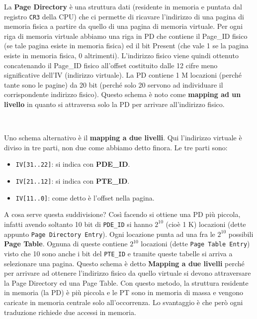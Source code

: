 \documentclass[11pt]{book}
\begin{document}
La \textbf{Page Directory} \`e una struttura dati (residente in
memoria e puntata dal registro \texttt{CR3} della CPU) che ci permette
di ricavare l'indirizzo di una pagina di memoria fisica a partire da
quello di una pagina di memoria virtuale. Per ogni riga di memoria
virtuale abbiamo una riga in PD che contiene il Page\_ID fisico (se
tale pagina esiste in memoria fisica) ed il bit Present (che vale 1 se
la pagina esiste in memoria fisica, 0 altrimenti). L'indirizzo fisico
viene quindi ottenuto concatenando il Page\_ID fisico all'offset
costituito dalle 12 cifre meno significative dell'IV (indirizzo
virtuale). La PD contiene 1 M locazioni (perch\'e tante sono le
pagine) da 20 bit (perch\'e solo 20 servono ad individuare il
corrispondente indirizzo fisico). Questo schema \`e noto come
\textbf{mapping ad un livello} in quanto si attraversa solo la PD per
arrivare all'indirizzo fisico.

\

Uno schema alternativo \`e il \textbf{mapping a due livelli}. Qui
l'indirizzo virtuale \`e diviso in tre parti, non due come abbiamo
detto finora. Le tre parti sono:

\begin{itemize}
\item \texttt{IV[31..22]}: si indica con \textbf{PDE\_ID}.
\item \texttt{IV[21..12]}: si indica con \textbf{PTE\_ID}.
\item \texttt{IV[11..0]}: come detto \`e l'offset nella pagina.
\end{itemize}

A cosa serve questa suddivisione? Cos\`i facendo si ottiene una PD
pi\`u piccola, infatti avendo soltanto 10 bit di \texttt{PDE\_ID} si
hanno $2^{10}$ (cio\`e 1 K) locazioni (dette appunto \texttt{Page
  Directory Entry}). Ogni locazione punta ad una fra le $2^{10}$
possibili \textbf{Page Table}. Ognuna di queste contiene $2^{10}$
locazioni (dette \texttt{Page Table Entry}) visto che 10 sono anche i
bit del \texttt{PTE\_ID} e tramite queste tabelle si arriva a
selezionare una pagina. Questo schema \`e detto \textbf{Mapping a due
  livelli} perch\'e per arrivare ad ottenere l'indirizzo fisico da
quello virtuale si devono attraversare la Page Directory ed una Page
Table. Con questo metodo, la struttura residente in memoria (la PD)
\`e pi\`u piccola e le PT sono in memoria di massa e vengono caricate
in memoria centrale solo all'occorrenza. Lo svantaggio \`e che per\`o
ogni traduzione richiede due accessi in memoria.
\end{document}
